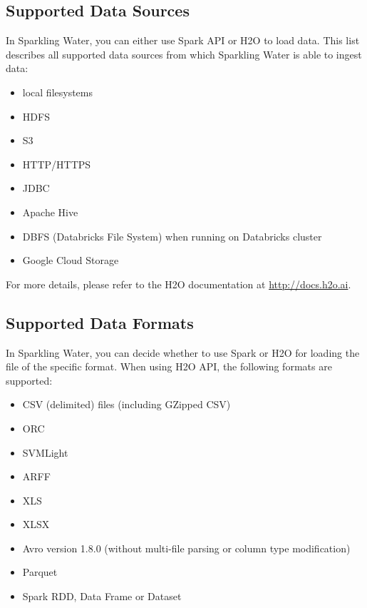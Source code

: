 \documentclass{standalone}
\begin{document}
    \subsection{Supported Data Sources}

    In Sparkling Water, you can either use Spark API or H2O to load data. This list describes
    all supported data sources from which Sparkling Water is able to ingest data:

    \begin{itemize}
        \item local filesystems
        \item HDFS
        \item S3
        \item HTTP/HTTPS
        \item JDBC
        \item Apache Hive
        \item DBFS (Databricks File System) when running on Databricks cluster
        \item Google Cloud Storage
    \end{itemize}

    For more details, please refer to the H2O documentation at {\url{http://docs.h2o.ai}}.

    \subsection{Supported Data Formats}

    In Sparkling Water, you can decide whether to use Spark or H2O for loading the file of the specific format.
    When using H2O API, the following formats are supported:

    \begin{itemize}
        \item CSV (delimited) files (including GZipped CSV)
        \item ORC
        \item SVMLight
        \item ARFF
        \item XLS
        \item XLSX
        \item Avro version 1.8.0 (without multi-file parsing or column type modification)
        \item Parquet
        \item Spark RDD, Data Frame or Dataset
    \end{itemize}
\end{document}
